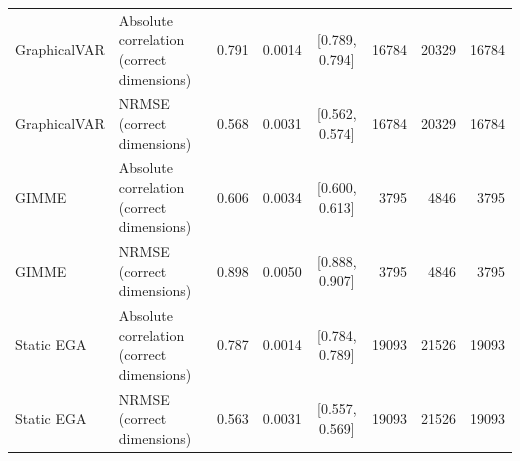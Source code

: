 \documentclass[
]{article}
\begin{document}
\begin{landscape}
\begin{table}
\begin{tabular}[t]{p{1.00in}p{2.85in}rrcrrr}
\addlinespace
GraphicalVAR & Absolute correlation (correct dimensions) & 0.791 & 0.0014 & {}[0.789, 0.794] & 16784 & 20329 & 16784\\
GraphicalVAR & NRMSE (correct dimensions) & 0.568 & 0.0031 & {}[0.562, 0.574] & 16784 & 20329 & 16784\\
GIMME & Absolute correlation (correct dimensions) & 0.606 & 0.0034 & {}[0.600, 0.613] & 3795 & 4846 & 3795\\
GIMME & NRMSE (correct dimensions) & 0.898 & 0.0050 & {}[0.888, 0.907] & 3795 & 4846 & 3795\\
Static EGA & Absolute correlation (correct dimensions) & 0.787 & 0.0014 & {}[0.784, 0.789] & 19093 & 21526 & 19093\\
\addlinespace
Static EGA & NRMSE (correct dimensions) & 0.563 & 0.0031 & {}[0.557, 0.569] & 19093 & 21526 & 19093\\
\bottomrule
\end{tabular}
\end{table}
\clearpage
\begin{table}


\end{table}
\end{landscape}
\end{document}
